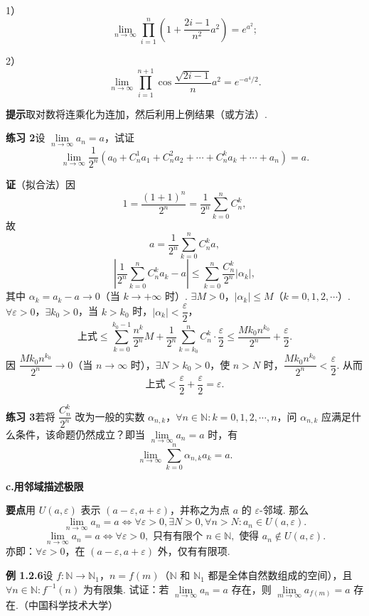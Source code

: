 \documentclass[UTF8, 12pt, fontset=fandol, oneside]{ctexart}
\begin{document}
1）
\[
  \lim_{n\to\infty}\prod_{i=1}^n\left(1+\frac{2i-1}{n^2}a^2\right)=e^{a^2};
\]

2）
\[
  \lim_{n\to\infty}\prod_{i=1}^{n+1}\cos\frac{\sqrt{2i-1}}{n}a^2=e^{-a^4/2}.
\]

\noindent\textbf{提示}\quad 取对数将连乘化为连加，然后利用上例结果（或方法）.

\noindent\textbf{练习 2}\quad 设 $\lim\limits_{n\to\infty}a_n=a$，试证
\[
  \lim_{n\to\infty}\frac1{2^n}\left(a_0+C_n^1a_1+C_n^2a_2+\cdots+C_n^ka_k+\cdots+a_n\right)=a.
\]

\noindent\textbf{证}\quad （拟合法）因
\[
  1=\frac{(1+1)^n}{2^n}=\frac1{2^n}\sum_{k=0}^n C_n^k,
\]
故
\[
  a=\frac1{2^n}\sum_{k=0}^n C_n^k a,
\]
\[
  \left|\frac1{2^n}\sum_{k=0}^n C_n^ka_k-a\right|
  \le \sum_{k=0}^n\frac{C_n^k}{2^n}|\alpha_k|,
\]
其中 $\alpha_k=a_k-a\to0$（当 $k\to+\infty$ 时）. $\exists M>0$，$|\alpha_k|\le M$（$k=0,1,2,\cdots$）. $\forall\varepsilon>0$，$\exists k_0>0$，当 $k>k_0$ 时，$|\alpha_k|<\dfrac\varepsilon2$，
\[
  \text{上式}\le \sum_{k=0}^{k_0-1}\frac{n^k}{2^n}M+\frac1{2^n}\sum_{k=k_0}^n C_n^k\cdot\frac\varepsilon2
  \le \frac{Mk_0n^{k_0}}{2^n}+\frac\varepsilon2.
\]
因 $\dfrac{Mk_0n^{k_0}}{2^n}\to0$（当 $n\to\infty$ 时），$\exists N>k_0>0$，使 $n>N$ 时，$\dfrac{Mk_0n^{k_0}}{2^n}<\dfrac\varepsilon2$. 从而
\[
  \text{上式}<\frac\varepsilon2+\frac\varepsilon2=\varepsilon.
\]

\noindent\textbf{练习 3}\quad 若将 $\dfrac{C_n^k}{2^n}$ 改为一般的实数 $\alpha_{n,k}$，$\forall n\in\mathbb{N}:k=0,1,2,\cdots,n$，问 $\alpha_{n,k}$ 应满足什么条件，该命题仍然成立？即当 $\lim\limits_{n\to\infty}a_n=a$ 时，有
\[
  \lim_{n\to\infty}\sum_{k=0}^n\alpha_{n,k}a_k=a.
\]

\noindent\textbf{c.\quad 用邻域描述极限}

\noindent\textbf{要点}\quad 用 $U(a,\varepsilon)$ 表示 $(a-\varepsilon,a+\varepsilon)$，并称之为点 $a$ 的 $\varepsilon$-邻域. 那么
\[
  \lim_{n\to\infty}a_n=a\Leftrightarrow
  \forall\varepsilon>0,\exists N>0,\forall n>N:a_n\in U(a,\varepsilon).
\tag{A}
\]
\[
  \lim_{n\to\infty}a_n=a\Leftrightarrow
  \forall\varepsilon>0,\text{ 只有有限个 }n\in\mathbb{N},\text{ 使得 }a_n\notin U(a,\varepsilon).
\tag{B}
\]
亦即：$\forall\varepsilon>0$，在 $(a-\varepsilon,a+\varepsilon)$ 外，仅有有限项.

\noindent\textbf{例 1.2.6}\quad 设 $f:\mathbb{N}\to\mathbb{N}_1$，$n=f(m)$（$\mathbb{N}$ 和 $\mathbb{N}_1$ 都是全体自然数组成的空间），且 $\forall n\in\mathbb{N}:f^{-1}(n)$ 为有限集. 试证：若 $\lim\limits_{n\to\infty}a_n=a$ 存在，则 $\lim\limits_{m\to\infty}a_{f(m)}=a$ 存在.（中国科学技术大学）
\end{document}

